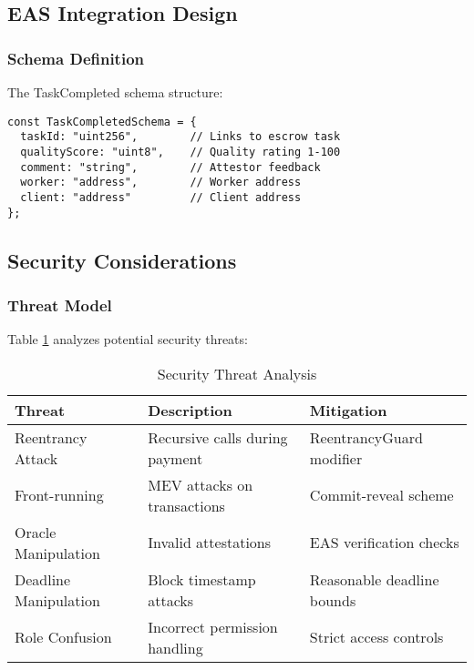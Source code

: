 \documentclass[12pt,a4paper]{article}
\begin{document}
\subsection{EAS Integration Design}

\subsubsection{Schema Definition}

The TaskCompleted schema structure:
\begin{lstlisting}[style=typescript]
const TaskCompletedSchema = {
  taskId: "uint256",        // Links to escrow task
  qualityScore: "uint8",    // Quality rating 1-100
  comment: "string",        // Attestor feedback
  worker: "address",        // Worker address
  client: "address"         // Client address
};
\end{lstlisting}

\subsection{Security Considerations}

\subsubsection{Threat Model}

Table \ref{tab:threat-model} analyzes potential security threats:

\begin{table}[h]
\centering
\begin{tabular}{|l|p{5cm}|p{5cm}|}
\hline
\textbf{Threat} & \textbf{Description} & \textbf{Mitigation} \\
\hline
Reentrancy Attack & Recursive calls during payment & ReentrancyGuard modifier \\
\hline
Front-running & MEV attacks on transactions & Commit-reveal scheme \\
\hline
Oracle Manipulation & Invalid attestations & EAS verification checks \\
\hline
Deadline Manipulation & Block timestamp attacks & Reasonable deadline bounds \\
\hline
Role Confusion & Incorrect permission handling & Strict access controls \\
\hline
\end{tabular}
\caption{Security Threat Analysis}
\label{tab:threat-model}
\end{table}
\end{document}
